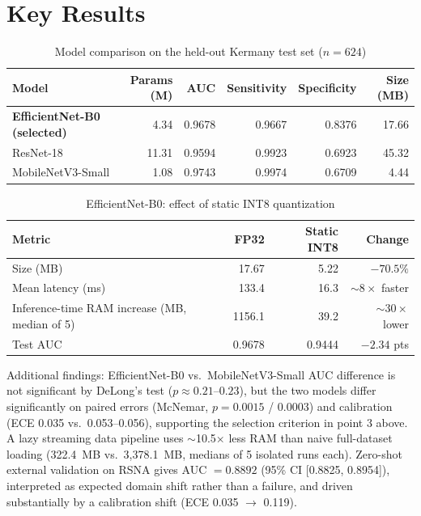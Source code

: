 \documentclass[11pt]{article}
\begin{document}
\section*{Key Results}

\begin{table}[h]
\centering
\caption{Model comparison on the held-out Kermany test set ($n=624$)}
\begin{tabular}{lrrrrr}
\toprule
Model & Params (M) & AUC & Sensitivity & Specificity & Size (MB) \\
\midrule
\textbf{EfficientNet-B0 (selected)} & 4.34 & 0.9678 & 0.9667 & 0.8376 & 17.66 \\
ResNet-18 & 11.31 & 0.9594 & 0.9923 & 0.6923 & 45.32 \\
MobileNetV3-Small & 1.08 & 0.9743 & 0.9974 & 0.6709 & 4.44 \\
\bottomrule
\end{tabular}
\end{table}

\begin{table}[h]
\centering
\caption{EfficientNet-B0: effect of static INT8 quantization}
\begin{tabular}{lrrr}
\toprule
Metric & FP32 & Static INT8 & Change \\
\midrule
Size (MB) & 17.67 & 5.22 & $-70.5\%$ \\
Mean latency (ms) & 133.4 & 16.3 & $\sim 8\times$ faster \\
Inference-time RAM increase (MB, median of 5) & 1156.1 & 39.2 & $\sim 30\times$ lower \\
Test AUC & 0.9678 & 0.9444 & $-2.34$ pts \\
\bottomrule
\end{tabular}
\end{table}

\noindent Additional findings: EfficientNet-B0 vs.\ MobileNetV3-Small AUC
difference is not significant by DeLong's test ($p \approx 0.21$--$0.23$),
but the two models differ significantly on paired errors (McNemar,
$p = 0.0015$ / $0.0003$) and calibration (ECE 0.035 vs.\ 0.053--0.056),
supporting the selection criterion in point 3 above. A lazy streaming data
pipeline uses $\sim$10.5$\times$ less RAM than naive full-dataset loading
(322.4~MB vs.\ 3{,}378.1~MB, medians of 5 isolated runs each). Zero-shot
external validation on RSNA gives
AUC $= 0.8892$ (95\% CI [0.8825, 0.8954]), interpreted as expected domain
shift rather than a failure, and driven substantially by a calibration
shift (ECE 0.035 $\rightarrow$ 0.119).
\end{document}
